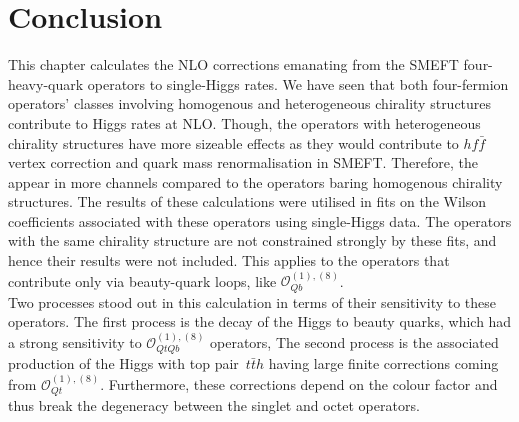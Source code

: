 	\section{Conclusion \label{sec:conclusion4tops}}
	This chapter calculates the NLO corrections emanating from the SMEFT four-heavy-quark operators to single-Higgs rates. We have seen that both four-fermion operators' classes involving homogenous and heterogeneous chirality structures contribute to Higgs rates at NLO. Though, the operators with heterogeneous chirality structures have more sizeable effects as they would contribute to $h f\bar f$ vertex correction and quark mass renormalisation in SMEFT. Therefore, the appear in more channels compared to the operators baring homogenous chirality structures. The results of these calculations were utilised in fits on the Wilson coefficients associated with these operators using single-Higgs data. The operators with the same chirality structure are not constrained strongly by these fits, and hence their results were not included. This applies to the operators that contribute only via beauty-quark loops, like $\mathcal{O}_{Qb}^{(1),(8)}$. \\ Two processes stood out in this calculation in terms of their sensitivity to these operators. The first process is the decay of the Higgs to beauty quarks, which had a strong sensitivity to $\mathcal{O}_{QtQb}^{(1),(8)}$ operators, The second process is the associated production of the Higgs with top pair~$t \bar th$ having large finite corrections coming from $\mathcal{O}_{Qt}^{(1),(8)}$. Furthermore, these corrections depend on the colour factor and thus break the degeneracy between the singlet and octet operators. \\
